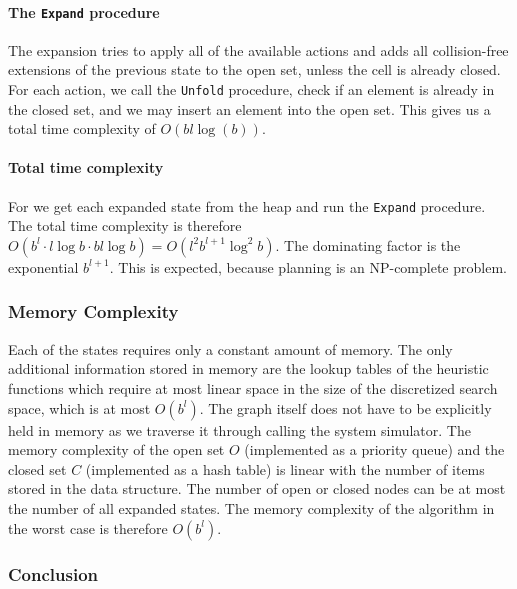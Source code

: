\paragraph{The \texttt{Expand} procedure}
The expansion tries to apply all of the available actions and adds all collision-free extensions of the previous state to the open set, unless the cell is already closed. For each action, we call the \texttt{Unfold} procedure, check if an element is already in the closed set, and we may insert an element into the open set. This gives us a total time complexity of $O(bl \log(b))$.

\paragraph{Total time complexity} For we get each expanded state from the heap and run the \texttt{Expand} procedure. The total time complexity is therefore $O(b^l \cdot l\log b \cdot bl \log b)=O(l^{2}b^{l+1}\log^2 b)$. The dominating factor is the exponential $b^{l+1}$. This is expected, because planning is an NP-complete problem. 

\subsubsection{Memory Complexity}

Each of the states requires only a constant amount of memory. The only additional information stored in memory are the lookup tables of the heuristic functions which require at most linear space in the size of the discretized search space, which is at most $O(b^l)$. The graph itself does not have to be explicitly held in memory as we traverse it through calling the system simulator. The memory complexity of the open set $O$ (implemented as a priority queue) and the closed set $C$ (implemented as a hash table) is linear with the number of items stored in the data structure. The number of open or closed nodes can be at most the number of all expanded states. The memory complexity of the algorithm in the worst case is therefore $O(b^l)$.

\subsubsection{Conclusion}

